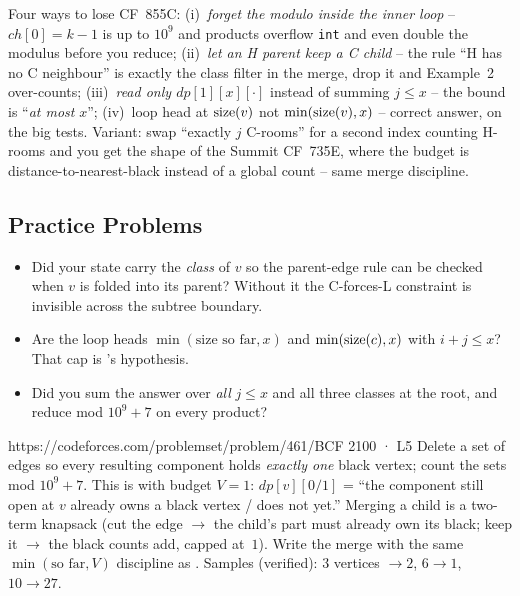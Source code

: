 \begin{warningbox}
Four ways to lose CF~855C: (i)~\emph{forget the modulo inside the inner loop} --
$\mathit{ch}[0]=k-1$ is up to $10^9$ and products overflow \lstinline{int} and even
double the modulus before you reduce; (ii)~\emph{let an H parent keep a C child}
-- the rule ``H has no C neighbour'' is exactly the class filter in the merge, drop
it and Example~2 over-counts; (iii)~\emph{read only $\mathit{dp}[1][x][\cdot]$}
instead of summing $j\le x$ -- the bound is ``\emph{at most} $x$''; (iv)~loop head
at $\operatorname{size}(v)$ not $\min(\operatorname{size}(v),x)$ -- correct answer, \tle on the big tests.
Variant: swap ``exactly $j$ C-rooms'' for a second index counting H-rooms and you
get the shape of the Summit CF~735E, where the budget is distance-to-nearest-black
instead of a global count -- same merge discipline.
\end{warningbox}

\subsection{Practice Problems}

\begin{stuckbox}
\begin{itemize}[nosep, leftmargin=1.4em]
  \item Did your state carry the \emph{class} of $v$ so the parent-edge rule can
        be checked when $v$ is folded into its parent? Without it the C-forces-L
        constraint is invisible across the subtree boundary.
  \item Are the loop heads $\min(\text{size so far}, x)$ and $\min(\operatorname{size}(c), x)$
        with $i + j \le x$? That cap is 's hypothesis.
  \item Did you sum the answer over \emph{all} $j \le x$ and all three classes at
        the root, and reduce mod $10^9+7$ on every product?
\end{itemize}
\end{stuckbox}

\begin{practiceset}
    {https://codeforces.com/problemset/problem/461/B}{CF 2100 · L5}
    {Delete a set of edges so every resulting component holds \emph{exactly one}
    black vertex; count the sets mod $10^9+7$. This is 
    with budget $V=1$: $\mathit{dp}[v][0/1]$ = ``the component still open at $v$
    already owns a black vertex / does not yet.'' Merging a child is a two-term
    knapsack (cut the edge $\to$ the child's part must already own its black;
    keep it $\to$ the black counts add, capped at~$1$). Write the merge with the
    same $\min(\text{so far},V)$ discipline as . Samples
    (verified): $3$ vertices $\to 2$, $6\to1$, $10\to27$.
    }
\end{practiceset}


